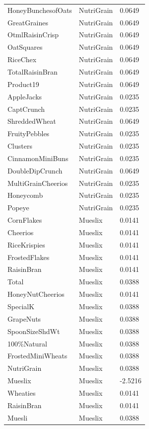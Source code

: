 \begin{table}[!htbp]
\begin{tabular}{lll}
\\
HoneyBunchesofOats & NutriGrain & 0.0649
\\
GreatGraines & NutriGrain & 0.0649
\\
OtmlRaisinCrisp & NutriGrain & 0.0649
\\
OatSquares & NutriGrain & 0.0649
\\
RiceChex & NutriGrain & 0.0649
\\
TotalRaisinBran & NutriGrain & 0.0649
\\
Product19 & NutriGrain & 0.0649
\\
AppleJacks & NutriGrain & 0.0235
\\
CaptCrunch & NutriGrain & 0.0235
\\
ShreddedWheat & NutriGrain & 0.0649
\\
FruityPebbles & NutriGrain & 0.0235
\\
Clusters & NutriGrain & 0.0235
\\
CinnamonMiniBuns & NutriGrain & 0.0235
\\
DoubleDipCrunch & NutriGrain & 0.0649
\\
MultiGrainCheerios & NutriGrain & 0.0235
\\
Honeycomb & NutriGrain & 0.0235
\\
Popeye & NutriGrain & 0.0235
\\
CornFlakes & Mueslix & 0.0141
\\
Cheerios & Mueslix & 0.0141
\\
RiceKrispies & Mueslix & 0.0141
\\
FrostedFlakes & Mueslix & 0.0141
\\
RaisinBran & Mueslix & 0.0141
\\
Total & Mueslix & 0.0388
\\
HoneyNutCheerios & Mueslix & 0.0141
\\
SpecialK & Mueslix & 0.0388
\\
GrapeNuts & Mueslix & 0.0388
\\
SpoonSizeShdWt & Mueslix & 0.0388
\\
100\%Natural & Mueslix & 0.0388
\\
FrostedMiniWheats & Mueslix & 0.0388
\\
NutriGrain & Mueslix & 0.0388
\\
Mueslix & Mueslix & -2.5216
\\
Wheaties & Mueslix & 0.0141
\\
RaisinBran & Mueslix & 0.0141
\\
Muesli & Mueslix & 0.0388
\\

\end{tabular}
\end{table}
